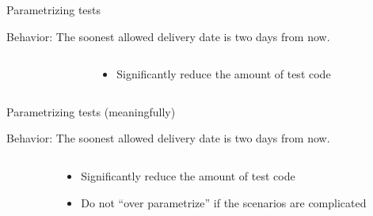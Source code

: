 \documentclass[english,10pt,aspectratio=169,t]{beamer}
\begin{document}
\begin{frame}{Parametrizing tests}
  \begin{minipage}{\textwidth}
    Behavior: The soonest allowed delivery date is two days from now. 
  \end{minipage}
  \begin{columns}[T]
    \begin{column}{0.5\textwidth}
      \begin{minipage}{\textwidth}
        \parametrizeall
      \end{minipage}
    \end{column}
    \begin{column}{0.5\textwidth}
      \begin{itemize}
        \item Significantly reduce the amount of test code
      \end{itemize}
    \end{column}
  \end{columns}
\end{frame}

\begin{frame}{Parametrizing tests (meaningfully)}
  \begin{minipage}{\textwidth}
    Behavior: The soonest allowed delivery date is two days from now. 
  \end{minipage}
  \begin{columns}[T]
    \begin{column}{0.5\textwidth}
      \begin{minipage}{\textwidth}
        \parametrizesome
      \end{minipage}
    \end{column}
    \begin{column}{0.5\textwidth}
      \begin{itemize}
        \item Significantly reduce the amount of test code
        \item Do not ``over parametrize'' if the scenarios are complicated
      \end{itemize}
    \end{column}
  \end{columns}
\end{frame}
\end{document}
